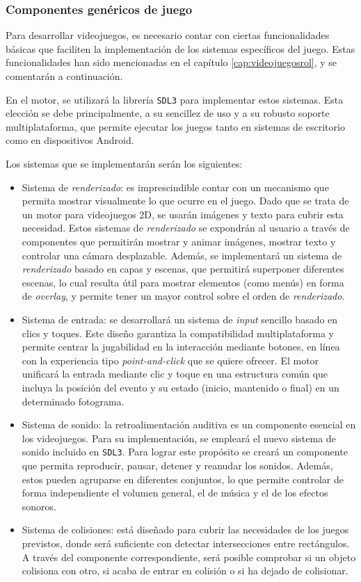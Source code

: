 \subsubsection{Componentes genéricos de juego}
Para desarrollar videojuegos, es necesario contar con ciertas funcionalidades básicas que faciliten la implementación de los sistemas específicos del juego. Estas funcionalidades han sido mencionadas en el capítulo \ref{cap:videojuegosrol}, y se comentarán a continuación.

\smallskip

En el motor, se utilizará la librería \texttt{SDL3} para implementar estos sistemas. Esta elección se debe principalmente, a su sencillez de uso y a su robusto soporte multiplataforma, que permite ejecutar los juegos tanto en sistemas de escritorio como en dispositivos Android.

\medskip

Los sistemas que se implementarán serán los siguientes:
\begin{itemize}
	\item Sistema de \textit{renderizado}: es imprescindible contar con un mecanismo que permita mostrar visualmente lo que ocurre en el juego. Dado que se trata de un motor para videojuegos 2D, se usarán imágenes y texto para cubrir esta necesidad. Estos sistemas de \textit{renderizado} se expondrán al usuario a través de componentes que permitirán mostrar y animar imágenes, mostrar texto y controlar una cámara desplazable. Además, se implementará un sistema de \textit{renderizado} basado en capas y escenas, que permitirá superponer diferentes escenas, lo cual resulta útil para mostrar elementos (como menús) en forma de \textit{overlay}, y permite tener un mayor control sobre el orden de \textit{renderizado}.
	\item Sistema de entrada: se desarrollará un sistema de \textit{input} sencillo basado en clics y toques. Este diseño garantiza la compatibilidad multiplataforma y permite centrar la jugabilidad en la interacción mediante botones, en línea con la experiencia tipo \textit{point-and-click} que se quiere ofrecer. El motor unificará la entrada mediante clic y toque en una estructura común que incluya la posición del evento y su estado (inicio, mantenido o final) en un determinado fotograma.
	\item Sistema de sonido: la retroalimentación auditiva es un componente esencial en los videojuegos. Para su implementación, se empleará el nuevo sistema de sonido incluido en \texttt{SDL3}. Para lograr este propósito se creará un componente que permita reproducir, pausar, detener y reanudar los sonidos. Además, estos pueden agruparse en diferentes conjuntos, lo que permite controlar de forma independiente el volumen general, el de música y el de los efectos sonoros.
	\item Sistema de colisiones: está diseñado para cubrir las necesidades de los juegos previstos, donde será suficiente con detectar intersecciones entre rectángulos. A través del componente correspondiente, será posible comprobar si un objeto colisiona con otro, si acaba de entrar en colisión o si ha dejado de colisionar.
\end{itemize}

